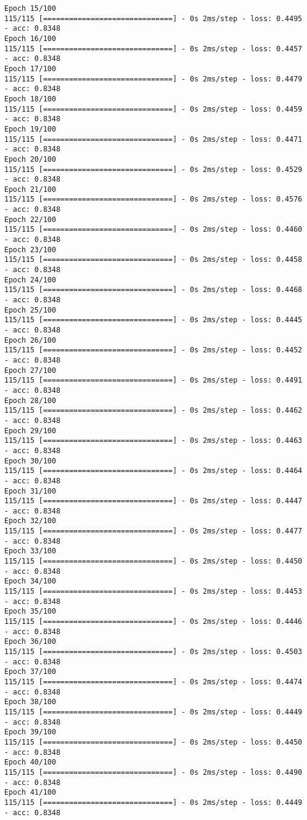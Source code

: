\documentclass[11pt]{article}
\begin{document}
\begin{Verbatim}[commandchars=\\\{\}]
Epoch 15/100
115/115 [==============================] - 0s 2ms/step - loss: 0.4495 - acc: 0.8348
Epoch 16/100
115/115 [==============================] - 0s 2ms/step - loss: 0.4457 - acc: 0.8348
Epoch 17/100
115/115 [==============================] - 0s 2ms/step - loss: 0.4479 - acc: 0.8348
Epoch 18/100
115/115 [==============================] - 0s 2ms/step - loss: 0.4459 - acc: 0.8348
Epoch 19/100
115/115 [==============================] - 0s 2ms/step - loss: 0.4471 - acc: 0.8348
Epoch 20/100
115/115 [==============================] - 0s 2ms/step - loss: 0.4529 - acc: 0.8348
Epoch 21/100
115/115 [==============================] - 0s 2ms/step - loss: 0.4576 - acc: 0.8348
Epoch 22/100
115/115 [==============================] - 0s 2ms/step - loss: 0.4460 - acc: 0.8348
Epoch 23/100
115/115 [==============================] - 0s 2ms/step - loss: 0.4458 - acc: 0.8348
Epoch 24/100
115/115 [==============================] - 0s 2ms/step - loss: 0.4468 - acc: 0.8348
Epoch 25/100
115/115 [==============================] - 0s 2ms/step - loss: 0.4445 - acc: 0.8348
Epoch 26/100
115/115 [==============================] - 0s 2ms/step - loss: 0.4452 - acc: 0.8348
Epoch 27/100
115/115 [==============================] - 0s 2ms/step - loss: 0.4491 - acc: 0.8348
Epoch 28/100
115/115 [==============================] - 0s 2ms/step - loss: 0.4462 - acc: 0.8348
Epoch 29/100
115/115 [==============================] - 0s 2ms/step - loss: 0.4463 - acc: 0.8348
Epoch 30/100
115/115 [==============================] - 0s 2ms/step - loss: 0.4464 - acc: 0.8348
Epoch 31/100
115/115 [==============================] - 0s 2ms/step - loss: 0.4447 - acc: 0.8348
Epoch 32/100
115/115 [==============================] - 0s 2ms/step - loss: 0.4477 - acc: 0.8348
Epoch 33/100
115/115 [==============================] - 0s 2ms/step - loss: 0.4450 - acc: 0.8348
Epoch 34/100
115/115 [==============================] - 0s 2ms/step - loss: 0.4453 - acc: 0.8348
Epoch 35/100
115/115 [==============================] - 0s 2ms/step - loss: 0.4446 - acc: 0.8348
Epoch 36/100
115/115 [==============================] - 0s 2ms/step - loss: 0.4503 - acc: 0.8348
Epoch 37/100
115/115 [==============================] - 0s 2ms/step - loss: 0.4474 - acc: 0.8348
Epoch 38/100
115/115 [==============================] - 0s 2ms/step - loss: 0.4449 - acc: 0.8348
Epoch 39/100
115/115 [==============================] - 0s 2ms/step - loss: 0.4450 - acc: 0.8348
Epoch 40/100
115/115 [==============================] - 0s 2ms/step - loss: 0.4490 - acc: 0.8348
Epoch 41/100
115/115 [==============================] - 0s 2ms/step - loss: 0.4449 - acc: 0.8348

\end{Verbatim}
\end{document}
